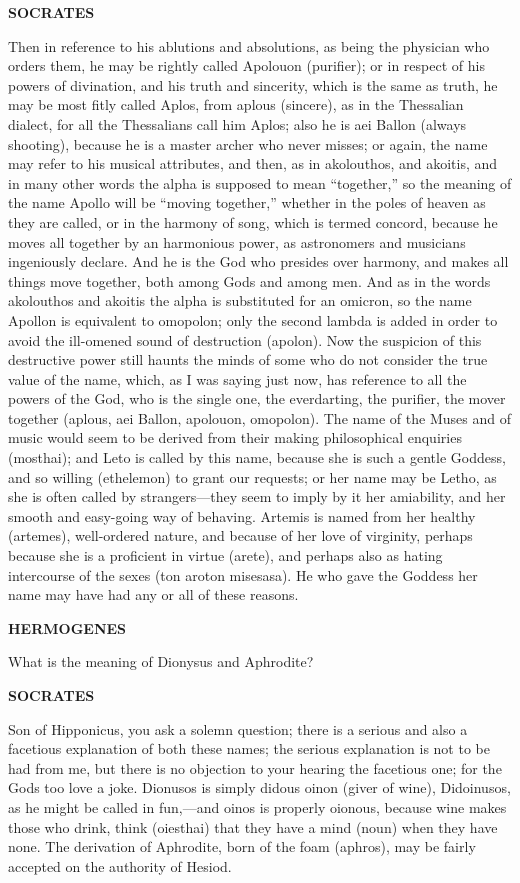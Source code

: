 \documentclass[11pt,letter]{article}
\begin{document}
\par \textbf{SOCRATES}
\par   Then in reference to his ablutions and absolutions, as being the physician who orders them, he may be rightly called Apolouon (purifier); or in respect of his powers of divination, and his truth and sincerity, which is the same as truth, he may be most fitly called Aplos, from aplous (sincere), as in the Thessalian dialect, for all the Thessalians call him Aplos; also he is aei Ballon (always shooting), because he is a master archer who never misses; or again, the name may refer to his musical attributes, and then, as in akolouthos, and akoitis, and in many other words the alpha is supposed to mean “together,” so the meaning of the name Apollo will be “moving together,” whether in the poles of heaven as they are called, or in the harmony of song, which is termed concord, because he moves all together by an harmonious power, as astronomers and musicians ingeniously declare. And he is the God who presides over harmony, and makes all things move together, both among Gods and among men. And as in the words akolouthos and akoitis the alpha is substituted for an omicron, so the name Apollon is equivalent to omopolon; only the second lambda is added in order to avoid the ill-omened sound of destruction (apolon). Now the suspicion of this destructive power still haunts the minds of some who do not consider the true value of the name, which, as I was saying just now, has reference to all the powers of the God, who is the single one, the everdarting, the purifier, the mover together (aplous, aei Ballon, apolouon, omopolon). The name of the Muses and of music would seem to be derived from their making philosophical enquiries (mosthai); and Leto is called by this name, because she is such a gentle Goddess, and so willing (ethelemon) to grant our requests; or her name may be Letho, as she is often called by strangers—they seem to imply by it her amiability, and her smooth and easy-going way of behaving. Artemis is named from her healthy (artemes), well-ordered nature, and because of her love of virginity, perhaps because she is a proficient in virtue (arete), and perhaps also as hating intercourse of the sexes (ton aroton misesasa). He who gave the Goddess her name may have had any or all of these reasons.

\par \textbf{HERMOGENES}
\par   What is the meaning of Dionysus and Aphrodite?

\par \textbf{SOCRATES}
\par   Son of Hipponicus, you ask a solemn question; there is a serious and also a facetious explanation of both these names; the serious explanation is not to be had from me, but there is no objection to your hearing the facetious one; for the Gods too love a joke. Dionusos is simply didous oinon (giver of wine), Didoinusos, as he might be called in fun,—and oinos is properly oionous, because wine makes those who drink, think (oiesthai) that they have a mind (noun) when they have none. The derivation of Aphrodite, born of the foam (aphros), may be fairly accepted on the authority of Hesiod.
\end{document}
